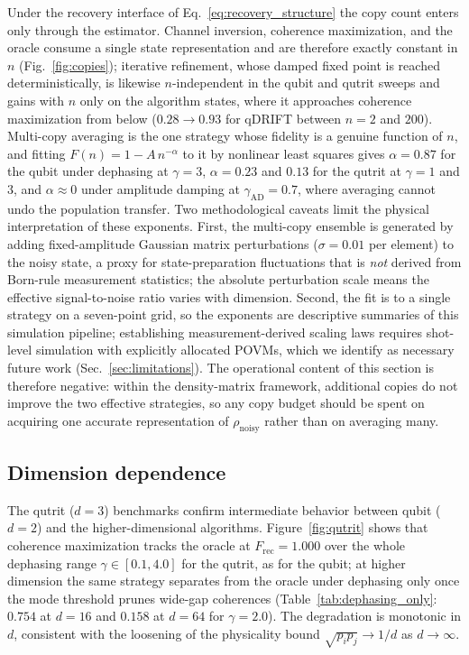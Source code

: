\documentclass[pra,twocolumn,superscriptaddress,longbibliography,floatfix,nofootinbib]{revtex4-2}
\newcommand{\Frec}{F_\mathrm{rec}}
\newcommand{\rhon}{\rho_\mathrm{noisy}}
\begin{document}
Under the recovery interface of Eq.~\eqref{eq:recovery_structure} the copy count enters only through the estimator.
Channel inversion, coherence maximization, and the oracle consume a single state representation and are therefore exactly constant in $n$ (Fig.~\ref{fig:copies}); iterative refinement, whose damped fixed point is reached deterministically, is likewise $n$-independent in the qubit and qutrit sweeps and gains with $n$ only on the algorithm states, where it approaches coherence maximization from below ($0.28 \to 0.93$ for qDRIFT between $n = 2$ and $200$).
Multi-copy averaging is the one strategy whose fidelity is a genuine function of $n$, and fitting $F(n) = 1 - A\,n^{-\alpha}$ to it by nonlinear least squares gives $\alpha = 0.87$ for the qubit under dephasing at $\gamma = 3$, $\alpha = 0.23$ and $0.13$ for the qutrit at $\gamma = 1$ and $3$, and $\alpha \approx 0$ under amplitude damping at $\gamma_\mathrm{AD} = 0.7$, where averaging cannot undo the population transfer.
Two methodological caveats limit the physical interpretation of these exponents.
First, the multi-copy ensemble is generated by adding fixed-amplitude Gaussian matrix perturbations ($\sigma = 0.01$ per element) to the noisy state, a proxy for state-preparation fluctuations that is \emph{not} derived from Born-rule measurement statistics; the absolute perturbation scale means the effective signal-to-noise ratio varies with dimension.
Second, the fit is to a single strategy on a seven-point grid, so the exponents are descriptive summaries of this simulation pipeline; establishing measurement-derived scaling laws requires shot-level simulation with explicitly allocated POVMs, which we identify as necessary future work (Sec.~\ref{sec:limitations}).
The operational content of this section is therefore negative: within the density-matrix framework, additional copies do not improve the two effective strategies, so any copy budget should be spent on acquiring one accurate representation of $\rhon$ rather than on averaging many.

\subsection{Dimension dependence}
\label{sec:dimension}

The qutrit ($d = 3$) benchmarks confirm intermediate behavior between qubit ($d = 2$) and the higher-dimensional algorithms.
Figure~\ref{fig:qutrit} shows that coherence maximization tracks the oracle at $\Frec = 1.000$ over the whole dephasing range $\gamma \in [0.1, 4.0]$ for the qutrit, as for the qubit; at higher dimension the same strategy separates from the oracle under dephasing only once the mode threshold prunes wide-gap coherences (Table~\ref{tab:dephasing_only}: $0.754$ at $d = 16$ and $0.158$ at $d = 64$ for $\gamma = 2.0$).
The degradation is monotonic in $d$, consistent with the loosening of the physicality bound $\sqrt{p_i p_j} \to 1/d$ as $d \to \infty$.
\end{document}
